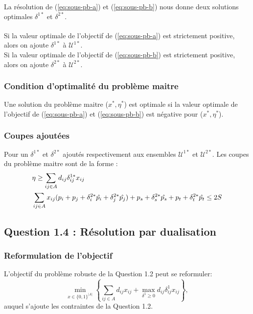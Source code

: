 \documentclass{article}
\begin{document}
La résolution de (\ref{eq:sous-pb-a}) et (\ref{eq:sous-pb-b}) nous donne deux solutions optimales $\delta^{1*}$ et $\delta^{2*}$. \\
\\
Si la valeur optimale de l'objectif de (\ref{eq:sous-pb-a}) est strictement positive, alors on ajoute $\delta^{1*}$ à $\mathcal{U}^{1*}$. \\
Si la valeur optimale de l'objectif de (\ref{eq:sous-pb-b}) est strictement positive, alors on ajoute $\delta^{2*}$ à $\mathcal{U}^{2*}$.

\subsubsection{Condition d'optimalité du problème maitre}
Une solution du problème maitre ($x^*, \eta^*$) est optimale si la valeur optimale de l'objectif de (\ref{eq:sous-pb-a}) et (\ref{eq:sous-pb-b}) est négative pour ($x^*, \eta^*$).

\subsubsection{Coupes ajoutées}

Pour un  $\delta^{1*}$ et $\delta^{2*}$ ajoutés respectivement aux ensembles $\mathcal{U}^{1*}$ et $\mathcal{U}^{2*}$. Les coupes du problème maitre sont de la forme : 
\begin{align}
  & \eta \geq \sum_{ij \in A} d_{ij} \delta_{ij}^{1*} x_{ij} \notag \\
  & \sum_{ij \in A} x_{ij}(p_i + p_j + \delta_{i}^{2*} \hat{p_i} + \delta_{j}^{2*} \hat{p_j}) + p_s + \delta_{s}^{2*} \hat{p_s} + p_t + \delta_{t}^{2*} \hat{p_t} \leq 2S \notag
\end{align}


\subsection{Question 1.4 : Résolution par dualisation}

\subsubsection{Reformulation de l'objectif}

L'objectif du problème robuste de la Question 1.2 peut se reformuler:
$$ \min_{x \in \{0,1\}^{|A|}} \left\{ \sum_{ij \in A} d_{ij} x_{ij} + \max_{\delta^{1} \geq 0} d_{ij} \delta_{ij}^{1} x_{ij} \right\},$$
auquel s'ajoute les contraintes de la Question 1.2.
\end{document}
